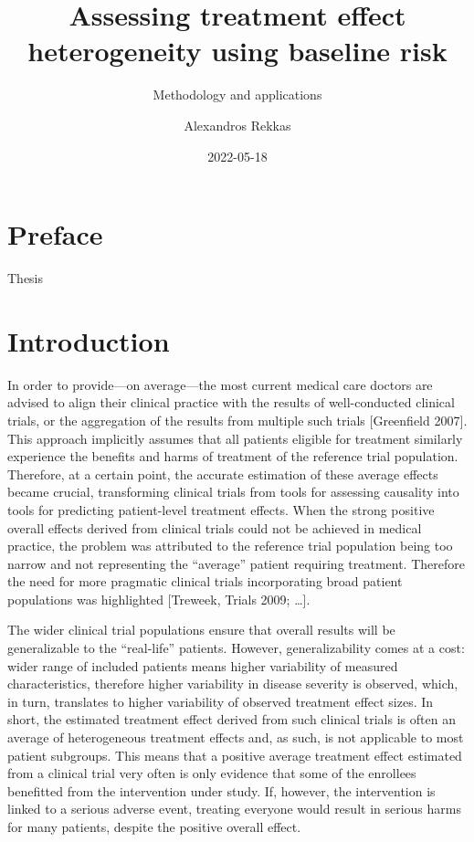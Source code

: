\documentclass[
]{book}
\title{Assessing treatment effect heterogeneity using baseline risk}
\subtitle{Methodology and applications}
\author{Alexandros Rekkas}
\date{2022-05-18}
\begin{document}
\maketitle

{
\setcounter{tocdepth}{1}
\tableofcontents
}
\hypertarget{preface}{%
\chapter*{Preface}\label{preface}}

Thesis

\hypertarget{introduction}{%
\chapter{Introduction}\label{introduction}}

In order to provide---on average---the most current medical care doctors are
advised to align their clinical practice with the results of well-conducted
clinical trials, or the aggregation of the results from multiple such trials
{[}Greenfield 2007{]}. This approach implicitly assumes that all patients eligible
for treatment similarly experience the benefits and harms of treatment of the
reference trial population. Therefore, at a certain point, the accurate
estimation of these average effects became crucial, transforming clinical trials
from tools for assessing causality into tools for predicting patient-level
treatment effects. When the strong positive overall effects derived from
clinical trials could not be achieved in medical practice, the problem was
attributed to the reference trial population being too narrow and not
representing the ``average'' patient requiring treatment. Therefore the need for
more pragmatic clinical trials incorporating broad patient populations was
highlighted {[}Treweek, Trials 2009; \ldots{]}.

The wider clinical trial populations ensure that overall results will be
generalizable to the ``real-life'' patients. However, generalizability comes at a
cost: wider range of included patients means higher variability of measured
characteristics, therefore higher variability in disease severity is observed,
which, in turn, translates to higher variability of observed treatment effect
sizes. In short, the estimated treatment effect derived from such clinical
trials is often an average of heterogeneous treatment effects and, as such, is
not applicable to most patient subgroups. This means that a positive average
treatment effect estimated from a clinical trial very often is only evidence
that some of the enrollees benefitted from the intervention under study. If,
however, the intervention is linked to a serious adverse event, treating
everyone would result in serious harms for many patients, despite the positive
overall effect.
\end{document}
